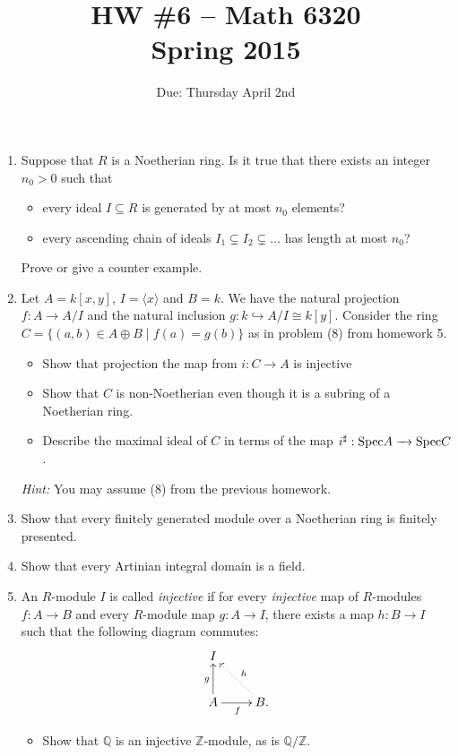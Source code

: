 \documentclass[11pt]{amsart}
\theoremstyle{theorem}
\renewcommand{\to}[1][]{\xrightarrow{\ #1\ }}
\newcommand{\bQ}{\mathbb{Q}}
\newcommand{\bZ}{\mathbb{Z}}
\newcommand{\Spec}{\textnormal{Spec}}
\begin{document}
\title{HW \#6 -- Math 6320\\Spring 2015}
\author{Due: Thursday April 2nd}
\maketitle

\begin{enumerate}
\item  Suppose that $R$ is a Noetherian ring.  Is it true that there exists an integer $n_0 > 0$ such that
\begin{itemize}
\item[(a)]  every ideal $I \subseteq R$ is generated by at most $n_0$ elements?
\item[(b)]  every ascending chain of ideals $I_1 \subsetneq I_2 \subsetneq \ldots$ has length at most $n_0$?
\end{itemize}
Prove or give a counter example.
\item Let $A = k[x,y]$, $I = \langle x \rangle$ and $B = k$.  We have the natural projection $f : A \to A/I$ and the natural inclusion $g : k \hookrightarrow A/I \cong k[y]$.  Consider the ring $C = \{ (a,b) \in A \oplus B \; |\; f(a) = g(b) \}$ as in problem (8) from homework 5.  
    \begin{itemize}
    \item[(a)]  Show that projection the map from $i : C \to A$ is injective
    \item[(b)]  Show that $C$ is non-Noetherian even though it is a subring of a Noetherian ring.
    \item[(c)]  Describe the maximal ideal of $C$ in terms of the map $i^{\sharp}: \Spec A \to \Spec C$.  
    \end{itemize}
    \vskip 3pt
    \emph{Hint:} You may assume (8) from the previous homework.
\item Show that every finitely generated module over a Noetherian ring is finitely presented.
\item Show that every Artinian integral domain is a field.
\item An $R$-module $I$ is called \emph{injective} if for every \emph{injective} map of $R$-modules $f : A \to B$ and every $R$-module map $g : A \to I$, there exists a map $h : B \to I$ such that the following diagram commutes:
    \[
    \xymatrix{
    I \\
    A \ar[u]^g \ar[r]_f & B \ar@{.>}[ul]_h.
    }
    \]
    \begin{itemize}
    \item[(a)]  Show that $\bQ$ is an injective $\bZ$-module, as is $\bQ/\bZ$.

\end{itemize}
\end{enumerate}
\end{document}

